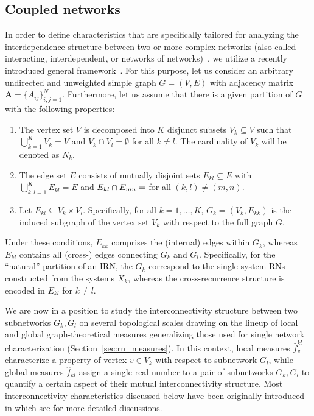 	\subsection{Coupled networks}
    
In order to define characteristics that are specifically tailored for analyzing the interdependence structure between two or more complex networks (also called interacting, interdependent, or networks of networks)~\cite{Buldyrev2010}, we utilize a recently introduced general framework~\cite{Donges2011i,Wiedermann2013}. For this purpose, let us consider an arbitrary undirected and unweighted simple graph $G=(V,E)$ with adjacency matrix $\textbf{A}=\{A_{ij}\}_{i,j=1}^N$. Furthermore, let us assume that there is a given partition of $G$ with the following properties:
\begin{enumerate}
\item The vertex set $V$ is decomposed into $K$ disjunct subsets $V_k \subseteq V$ such that $\bigcup_{k=1}^K V_k = V$ and $V_k \cap V_l = \emptyset$ for all $k \neq l$. The cardinality of $V_k$ will be denoted as $N_k$. 
\item The edge set $E$ consists of mutually disjoint sets $E_{kl} \subseteq E$ with $\bigcup_{k,l=1}^K E_{kl} = E$ and $E_{kl} \cap E_{mn}=\empty$ for all $(k,l) \neq (m,n)$.
\item Let $E_{kl}\subseteq V_k\times V_l$. Specifically, for all $k=1,\dots,K$, $G_k=(V_k,E_{kk})$ is the induced subgraph of the vertex set $V_k$ with respect to the full graph $G$.
\end{enumerate}
\noindent
Under these conditions, $E_{kk}$ comprises the (internal) edges within $G_k$, whereas $E_{kl}$ contains all (cross-) edges connecting $G_k$ and $G_l$. Specifically, for the ``natural'' partition of an IRN, the $G_k$ correspond to the single-system RNs constructed from the systems $X_k$, whereas the cross-recurrence structure is encoded in $E_{kl}$ for $k \neq l$.


We are now in a position to study the interconnectivity structure between two subnetworks $G_k, G_l$ on several topological scales drawing on the lineup of local and global graph-theoretical measures generalizing those used for single network characterization (Section~\ref{sec:rn_measures}). In this context, local measures $\hat{f}_v^{kl}$ characterize a property of vertex $v \in V_k$ with respect to subnetwork $G_l$, while global measures $\hat{f}_{kl}$ assign a single real number to a pair of subnetworks $G_k, G_l$ to quantify a certain aspect of their mutual interconnectivity structure. Most interconnectivity characteristics discussed below have been originally introduced in \cite{Donges2011i} which see for more detailed discussions.

